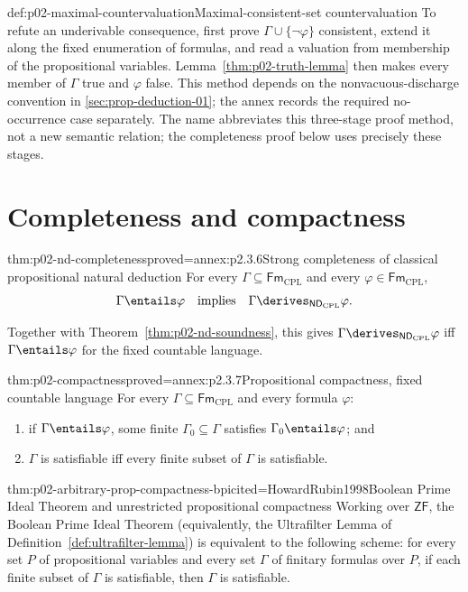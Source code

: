 \begin{hbmethod}{def:p02-maximal-countervaluation}{Maximal-consistent-set countervaluation}
To refute an underivable consequence, first prove
\(\Gamma\cup\{\neg\varphi\}\) consistent, extend it along the fixed
enumeration of formulas, and read a valuation from membership of the
propositional variables.  Lemma~\ref{thm:p02-truth-lemma} then makes every
member of \(\Gamma\) true and \(\varphi\) false.  This method depends on the
nonvacuous-discharge convention in \cref{sec:prop-deduction-01};
the annex records the required no-occurrence case separately.
The name abbreviates this three-stage proof method, not a new semantic
relation; the completeness proof below uses precisely these stages.
\end{hbmethod}

\section{Completeness and compactness}
\label{sec:p02-prop-completeness}

\begin{hbtheorem}{thm:p02-nd-completeness}{proved=annex:p2.3.6}{Strong completeness of classical propositional natural deduction}
For every \(\Gamma\subseteq\mathsf{Fm}_{\mathrm{CPL}}\) and every
\(\varphi\in\mathsf{Fm}_{\mathrm{CPL}}\),
\[
 \Gamma\entails\varphi
 \quad\text{implies}\quad
 \Gamma\derives_{\mathsf{ND}_{\mathrm{CPL}}}\varphi.
\]
\end{hbtheorem}

Together with Theorem~\ref{thm:p02-nd-soundness}, this gives
\(\Gamma\derives_{\mathsf{ND}_{\mathrm{CPL}}}\varphi\) iff
\(\Gamma\entails\varphi\) for the fixed countable language.

\begin{hbtheorem}{thm:p02-compactness}{proved=annex:p2.3.7}{Propositional compactness, fixed countable language}
For every \(\Gamma\subseteq\mathsf{Fm}_{\mathrm{CPL}}\) and every formula
\(\varphi\):
\begin{enumerate}
  \item if \(\Gamma\entails\varphi\), some finite
        \(\Gamma_0\subseteq\Gamma\) satisfies
        \(\Gamma_0\entails\varphi\); and
  \item \(\Gamma\) is satisfiable iff every finite subset of \(\Gamma\) is
        satisfiable.
\end{enumerate}
\end{hbtheorem}

\begin{hbtheorem}{thm:p02-arbitrary-prop-compactness-bpi}{cited=HowardRubin1998}{Boolean Prime Ideal Theorem and unrestricted propositional compactness}
Working over \(\mathsf{ZF}\), the Boolean Prime Ideal Theorem (equivalently,
the Ultrafilter Lemma of Definition~\ref{def:ultrafilter-lemma}) is equivalent
to the following scheme: for every set \(P\) of propositional variables and
every set \(\Gamma\) of finitary formulas over \(P\), if each finite subset
of \(\Gamma\) is satisfiable, then \(\Gamma\) is satisfiable.
\end{hbtheorem}

